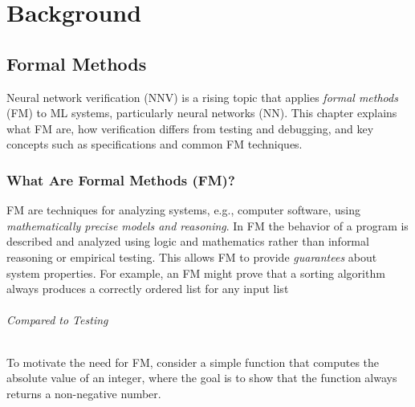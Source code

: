 \documentclass[oneside,11pt,dvipsnames]{book}
\numberwithin{equation}{section}
\theoremstyle{definition}
\theoremstyle{remark}
\begin{document}




\part{Background}\label{part:background}
\renewcommand{\appendixname}{Background}
\appendix

\chapter{Formal Methods}\label{chap:formal-methods}

Neural network verification (NNV) is a rising topic that applies \emph{formal methods} (FM) to ML systems, particularly neural networks (NN).  This chapter explains what FM are, how verification differs from testing and debugging, and key concepts such as specifications and common FM techniques.

\section{What Are Formal Methods (FM)?}

FM are techniques for analyzing systems, e.g., computer software, using \emph{mathematically precise models and reasoning}. In FM the behavior of a program is described and analyzed using logic and mathematics rather than informal reasoning or empirical testing. This allows FM to provide \emph{guarantees} about system properties. For example, an FM might prove that a sorting algorithm always produces a correctly ordered list for any input list

\paragraph{Compared to Testing} To motivate the need for FM, consider a simple function that computes the absolute value of an integer, where the goal is to show that the function always returns a non-negative number.
\end{document}

